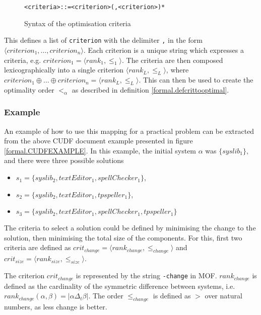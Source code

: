 \begin{figure}[h!]
\begin{center}
\begin{alltt}
<criteria> ::= <criterion> (, <criterion>)*
\end{alltt}
  \caption{Syntax of the optimisation criteria}
  \label{formal.optbnf}
\end{center}
\end{figure}
This defines a list of \verb+criterion+ with the delimiter \verb+,+ in the form $\langle criterion_1, \ldots, criterion_n \rangle$.
Each criterion is a unique string which expresses a criteria, e.g. $criterion_1 = \langle rank_1, \leq_1 \rangle$.
The criteria are then composed lexicographically into a single criterion $\langle rank_L, \leq_L \rangle$, 
where $criterion_1 \oplus \ldots \oplus criterion_n = \langle rank_L, \leq_L \rangle$. 
This can then be used to create the optimality order $<_{\alpha}$ as described in definition \ref{formal.defcrittooptimal}.

\subsubsection{Example}
An example of how to use this mapping for a practical problem can be extracted from the above CUDF document example presented in figure \ref{formal.CUDFEXAMPLE}.
In this example, the initial system $\alpha$ was  $\{syslib_1\}$, and there were three possible solutions
\begin{itemize}
  \item $s_1 = \{syslib_2, textEditor_1, spellChecker_1\}$,
  \item $s_2 = \{syslib_2, textEditor_1, tpspeller_1\}$,
  \item $s_3 = \{syslib_2, textEditor_1, spellChecker_1, tpspeller_1\}$
\end{itemize}

The criteria to select a solution could be defined by minimising the change to the solution, then minimising the total size of the components.
For this, first two criteria are defined as $crit_{change} = \langle rank_{change}, \leq_{change} \rangle$ and $crit_{size} = \langle rank_{size}, \leq_{size} \rangle$.

The criterion $crit_{change}$ is represented by the string \verb+-change+ in MOF.
$rank_{change}$ is defined as the cardinality of the symmetric difference between systems, i.e. $rank_{change}(\alpha,\beta) = |\alpha \Delta_t \beta|$.
The order $\leq_{change}$ is defined as $>$ over natural numbers, as less change is better. 

